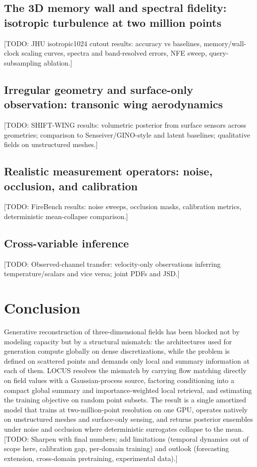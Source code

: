 \documentclass{article} %
\newcommand{\todo}[1]{{\color{red}[TODO: #1]}}
\newcommand{\model}{LOCUS}
\begin{document}
\subsection{The 3D memory wall and spectral fidelity: isotropic turbulence at two million points}
\label{sec:results-scaling}
\todo{JHU isotropic1024 cutout results: accuracy vs baselines, memory/wall-clock scaling curves, spectra and band-resolved errors, NFE sweep, query-subsampling ablation.}

\subsection{Irregular geometry and surface-only observation: transonic wing aerodynamics}
\label{sec:results-geometry}
\todo{SHIFT-WING results: volumetric posterior from surface sensors across geometries; comparison to Senseiver/GINO-style and latent baselines; qualitative fields on unstructured meshes.}

\subsection{Realistic measurement operators: noise, occlusion, and calibration}
\label{sec:results-realism}
\todo{FireBench results: noise sweeps, occlusion masks, calibration metrics, deterministic mean-collapse comparison.}

\subsection{Cross-variable inference}
\label{sec:results-crossvar}
\todo{Observed-channel transfer: velocity-only observations inferring temperature/scalars and vice versa; joint PDFs and JSD.}

\section{Conclusion}
\label{sec:conclusion}

Generative reconstruction of three-dimensional fields has been blocked not by modeling capacity but by a structural mismatch: the architectures used for generation compute globally on dense discretizations, while the problem is defined on scattered points and demands only local and summary information at each of them. \model{} resolves the mismatch by carrying flow matching directly on field values with a Gaussian-process source, factoring conditioning into a compact global summary and importance-weighted local retrieval, and estimating the training objective on random point subsets. The result is a single amortized model that trains at two-million-point resolution on one GPU, operates natively on unstructured meshes and surface-only sensing, and returns posterior ensembles under noise and occlusion where deterministic surrogates collapse to the mean. \todo{Sharpen with final numbers; add limitations (temporal dynamics out of scope here, calibration gap, per-domain training) and outlook (forecasting extension, cross-domain pretraining, experimental data).}
\end{document}
